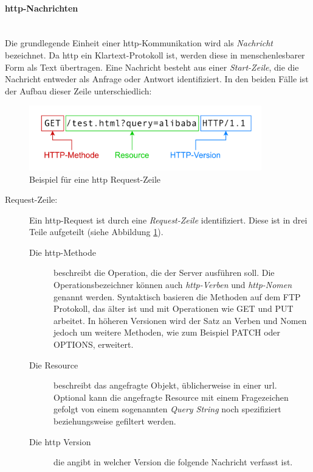 \paragraph{\ac{http}-Nachrichten \cite{HTTPMessagesHTTP2024}}
\ \\
Die grundlegende Einheit einer \ac{http}-Kommunikation wird als \textit{Nachricht} bezeichnet.
Da \ac{http} ein Klartext-Protokoll ist, werden diese in menschenlesbarer Form als Text übertragen.
Eine Nachricht besteht aus einer \textit{Start-Zeile}, die die Nachricht entweder als Anfrage oder Antwort identifiziert.
In den beiden Fälle ist der Aufbau dieser Zeile unterschiedlich:

\begin{figure}[!hbt]
     \centering
     \includegraphics[width=0.9\textwidth]{./images/HTTP-Requestline.png}
     \caption{Beispiel für eine \ac{http} Request-Zeile}
     \label{fig:http-requestline}
 \end{figure}

\begin{description}
     \item[Request-Zeile:] Ein \ac{http}-Request ist durch eine \textit{Request-Zeile} identifiziert. Diese ist in drei Teile aufgeteilt (siehe Abbildung \ref{fig:http-requestline}).
     \begin{description}
          \item[Die \ac{http}-Methode] beschreibt die Operation, die der Server ausführen soll.
          Die Operationsbezeichner können auch \textit{\ac{http}-Verben} und \textit{\ac{http}-Nomen} genannt werden.
          Syntaktisch basieren die Methoden auf dem FTP Protokoll, das älter ist und mit Operationen wie GET und PUT arbeitet.
          In höheren Versionen wird der Satz an Verben und Nomen jedoch um weitere Methoden, wie zum Beispiel PATCH oder OPTIONS, erweitert.
          \item[Die Resource] beschreibt das angefragte Objekt, üblicherweise in einer \ac{url}. 
          Optional kann die angefragte Resource mit einem Fragezeichen gefolgt von einem sogenannten \textit{Query String} noch spezifiziert beziehungsweise gefiltert werden.
          \item[Die \ac{http} Version] die angibt in welcher Version die folgende Nachricht verfasst ist. 
     \end{description}
\end{description}

